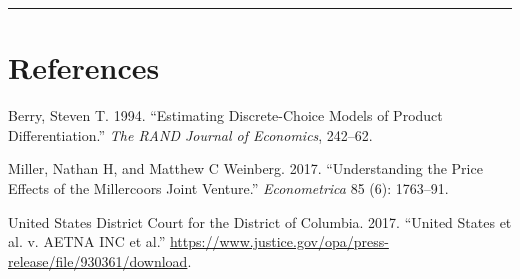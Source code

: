 \documentclass[]{article}
\begin{document}
\begin{center}\rule{0.5\linewidth}{\linethickness}\end{center}

\hypertarget{references}{%
\section*{References}\label{references}}

\hypertarget{refs}{}
\leavevmode\hypertarget{ref-berry1994}{}%
Berry, Steven T. 1994. ``Estimating Discrete-Choice Models of Product
Differentiation.'' \emph{The RAND Journal of Economics}, 242--62.

\leavevmode\hypertarget{ref-miller2017}{}%
Miller, Nathan H, and Matthew C Weinberg. 2017. ``Understanding the
Price Effects of the Millercoors Joint Venture.'' \emph{Econometrica} 85
(6): 1763--91.

\leavevmode\hypertarget{ref-aetna}{}%
United States District Court for the District of Columbia. 2017.
``United States et al. v. AETNA INC et al.''
\url{https://www.justice.gov/opa/press-release/file/930361/download}.
\end{document}
